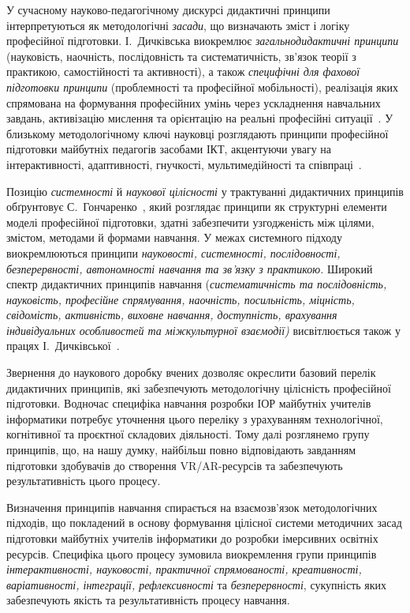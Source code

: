 У сучасному науково-педагогічному дискурсі дидактичні принципи інтерпретуються як методологічні \emph{засади}, що визначають зміст і логіку професійної підготовки. І.~Дичківська виокремлює \emph{загальнодидактичні принципи} (науковість, наочність, послідовність та систематичність, зв'язок теорії з практикою, самостійності та активності), а також \emph{специфічні для фахової підготовки принципи} (проблемності та професійної мобільності), реалізація яких спрямована на формування професійних умінь через ускладнення навчальних завдань, активізацію мислення та орієнтацію на реальні професійні ситуації~\cite{Dychkivska2012Innovative}. У близькому методологічному ключі науковці розглядають принципи професійної підготовки майбутніх педагогів засобами ІКТ, акцентуючи увагу на інтерактивності, адаптивності, гнучкості, мультимедійності та співпраці~\cite{Semerikov2023Motivational}.

Позицію \emph{системності} й \emph{наукової цілісності} у трактуванні дидактичних принципів обґрунтовує С.~Гончаренко~\cite{Goncharenko2011Pedagogy}, який розглядає принципи як структурні елементи моделі професійної підготовки, здатні забезпечити узгодженість між цілями, змістом, методами й формами навчання. У межах системного підходу виокремлюються принципи \emph{науковості, системності, послідовності, безперервності, автономності навчання та зв'язку з практикою.} Широкий спектр дидактичних принципів навчання (\emph{систематичність та послідовність, науковість, професійне спрямування, наочність, посильність, міцність, свідомість, активність, виховне навчання, доступність, врахування індивідуальних особливостей та міжкультурної взаємодії)} висвітлюється також у працях І.~Дичківської~\cite{Dychkivska2012Innovative}.

Звернення до наукового доробку вчених дозволяє окреслити базовий перелік дидактичних принципів, які забезпечують методологічну цілісність професійної підготовки. Водночас специфіка навчання розробки ІОР майбутніх учителів інформатики потребує уточнення цього переліку з урахуванням технологічної, когнітивної та проєктної складових діяльності. Тому далі розглянемо групу принципів, що, на нашу думку, найбільш повно відповідають завданням підготовки здобувачів до створення VR/AR-ресурсів та забезпечують результативність цього процесу.

Визначення принципів навчання спирається на взаємозв'язок методологічних підходів, що покладений в основу формування цілісної системи методичних засад підготовки майбутніх учителів інформатики до розробки імерсивних освітніх ресурсів. Специфіка цього процесу зумовила виокремлення групи принципів \emph{інтерактивності, науковості, практичної спрямованості, креативності, варіативності, інтеграції, рефлексивності} та \emph{безперервності}, сукупність яких забезпечують якість та результативність процесу навчання.

